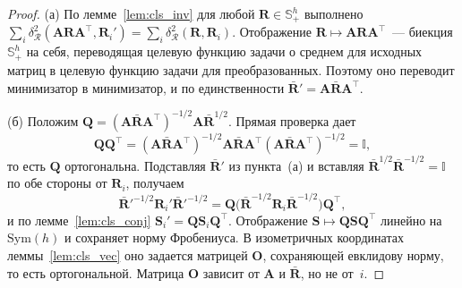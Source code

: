 \begin{proof}
(а) По лемме~\ref{lem:cls_inv} для любой $\mathbf{R} \in \mathbb{S}_{+}^{h}$ выполнено $\sum_i \delta_{\mathcal{R}}^2(\mathbf{A}\mathbf{R}\mathbf{A}^{\top}, \mathbf{R}_i') = \sum_i \delta_{\mathcal{R}}^2(\mathbf{R}, \mathbf{R}_i)$. Отображение $\mathbf{R} \mapsto \mathbf{A}\mathbf{R}\mathbf{A}^{\top}$~--- биекция $\mathbb{S}_{+}^{h}$ на себя, переводящая целевую функцию задачи о среднем для исходных матриц в целевую функцию задачи для преобразованных. Поэтому оно переводит минимизатор в минимизатор, и по единственности $\bar{\mathbf{R}}' = \mathbf{A}\bar{\mathbf{R}}\mathbf{A}^{\top}$.

(б) Положим $\mathbf{Q} = (\mathbf{A}\bar{\mathbf{R}}\mathbf{A}^{\top})^{-1/2} \mathbf{A} \bar{\mathbf{R}}^{1/2}$. Прямая проверка дает
\begin{equation*}
\mathbf{Q}\mathbf{Q}^{\top} = (\mathbf{A}\bar{\mathbf{R}}\mathbf{A}^{\top})^{-1/2} \mathbf{A}\bar{\mathbf{R}}\mathbf{A}^{\top} (\mathbf{A}\bar{\mathbf{R}}\mathbf{A}^{\top})^{-1/2} = \mathbb{I},
\end{equation*}
то есть $\mathbf{Q}$ ортогональна. Подставляя $\bar{\mathbf{R}}'$ из пункта~(а) и вставляя $\bar{\mathbf{R}}^{1/2}\bar{\mathbf{R}}^{-1/2} = \mathbb{I}$ по обе стороны от $\mathbf{R}_i$, получаем
\begin{equation*}
\bar{\mathbf{R}}'^{-1/2} \mathbf{R}_i' \bar{\mathbf{R}}'^{-1/2} = \mathbf{Q} \big( \bar{\mathbf{R}}^{-1/2} \mathbf{R}_i \bar{\mathbf{R}}^{-1/2} \big) \mathbf{Q}^{\top},
\end{equation*}
и по лемме~\ref{lem:cls_conj} $\mathbf{S}_i' = \mathbf{Q}\mathbf{S}_i\mathbf{Q}^{\top}$. Отображение $\mathbf{S} \mapsto \mathbf{Q}\mathbf{S}\mathbf{Q}^{\top}$ линейно на $\mathrm{Sym}(h)$ и сохраняет норму Фробениуса. В изометричных координатах леммы~\ref{lem:cls_vec} оно задается матрицей $\mathbf{O}$, сохраняющей евклидову норму, то есть ортогональной. Матрица $\mathbf{O}$ зависит от $\mathbf{A}$ и $\bar{\mathbf{R}}$, но не от~$i$.


\end{proof}

